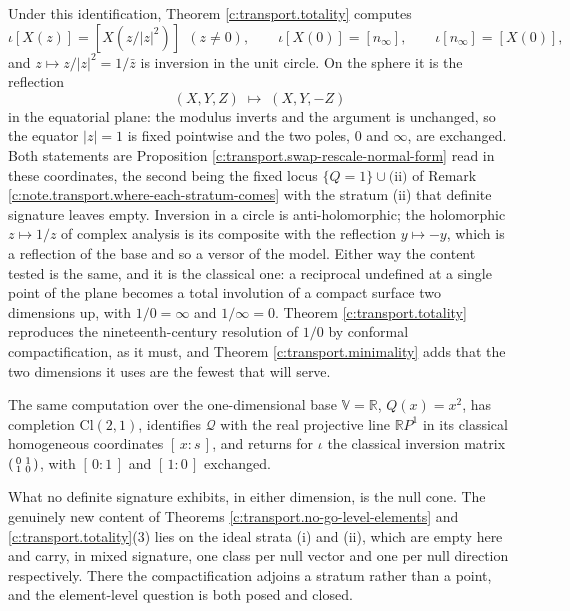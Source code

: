 \documentclass[11pt]{article}
\theoremstyle{definition}
\theoremstyle{plain}
\providecommand{\Cl}{}\renewcommand{\Cl}{\mathrm{Cl}}
\providecommand{\R}{}\renewcommand{\R}{\mathbb{R}}
\providecommand{\nInf}{}\renewcommand{\nInf}{n_\infty}
\begin{document}
Under this identification, Theorem \ref{c:transport.totality} computes
\[
\iota[X(z)] = [X(z/|z|^2)] \ \ (z \neq 0), \qquad \iota[X(0)] = [\nInf], \qquad \iota[\nInf] = [X(0)],
\]
and $z \mapsto z/|z|^2 = 1/\bar{z}$ is inversion in the unit circle. On the sphere it is the reflection
\[
(X, Y, Z) \;\mapsto\; (X, Y, -Z)
\]
in the equatorial plane: the modulus inverts and the argument is unchanged, so the equator $|z| = 1$ is fixed pointwise and the two poles, $0$ and $\infty$, are exchanged. Both statements are Proposition \ref{c:transport.swap-rescale-normal-form} read in these coordinates, the second being the fixed locus $\{Q = 1\} \cup \text{(ii)}$ of Remark \ref{c:note.transport.where-each-stratum-comes} with the stratum (ii) that definite signature leaves empty. Inversion in a circle is anti-holomorphic; the holomorphic $z \mapsto 1/z$ of complex analysis is its composite with the reflection $y \mapsto -y$, which is a reflection of the base and so a versor of the model. Either way the content tested is the same, and it is the classical one: a reciprocal undefined at a single point of the plane becomes a total involution of a compact surface two dimensions up, with $1/0 = \infty$ and $1/\infty = 0$. Theorem \ref{c:transport.totality} reproduces the nineteenth-century resolution of $1/0$ by conformal compactification, as it must, and Theorem \ref{c:transport.minimality} adds that the two dimensions it uses are the fewest that will serve.

The same computation over the one-dimensional base $\mathbb{V} = \R$, $Q(x) = x^2$, has completion $\Cl(2,1)$, identifies $\mathcal{Q}$ with the real projective line $\R P^1$ in its classical homogeneous coordinates $[\,x : s\,]$, and returns for $\iota$ the classical inversion matrix $\begin{psmallmatrix} 0 & 1 \\ 1 & 0 \end{psmallmatrix}$, with $[\,0:1\,]$ and $[\,1:0\,]$ exchanged.

What no definite signature exhibits, in either dimension, is the null cone. The genuinely new content of Theorems \ref{c:transport.no-go-level-elements} and \ref{c:transport.totality}(3) lies on the ideal strata (i) and (ii), which are empty here and carry, in mixed signature, one class per null vector and one per null direction respectively. There the compactification adjoins a stratum rather than a point, and the element-level question is both posed and closed.
\end{document}
